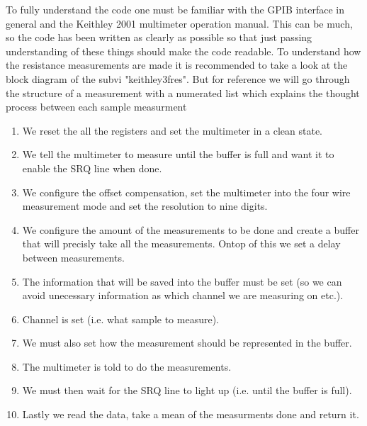 \documentclass[a4paper,12pt]{article}
\begin{document}
To fully understand the code one must be familiar with the GPIB interface in general and the Keithley 2001 multimeter operation manual. This can be much, so the code has been written as clearly as possible so that just passing understanding of these things should make the code readable. To understand how the resistance measurements are made it is recommended to take a look at the block diagram of the subvi "keithley3fres". But for reference we will go through the structure of a measurement with a numerated list which explains the thought process between each sample measurment

\begin{enumerate}
\item We reset the all the registers and set the multimeter in a clean state.
\item We tell the multimeter to measure until the buffer is full and want it to enable the SRQ line when done.
\item We configure the offset compensation, set the multimeter into the four wire measurement mode and set the resolution to nine digits.
\item We configure the amount of the measurements to be done and create a buffer that will precisly take all the measurements. Ontop of this we set a delay between measurements.
\item The information that will be saved into the buffer must be set (so we can avoid unecessary information as which channel we are measuring on etc.).
\item Channel is set (i.e. what sample to measure).
\item We must also set how the measurement should be represented in the buffer.
\item The multimeter is told to do the measurements.
\item We must then wait for the SRQ line to light up (i.e. until the buffer is full).
\item Lastly we read the data, take a mean of the measurments done and return it.
\end{enumerate}
\end{document}

